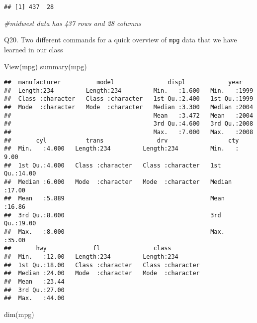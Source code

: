 \documentclass[
]{article}
\newenvironment{Shaded}{\begin{snugshade}}{\end{snugshade}}
\newcommand{\CommentTok}[1]{\textcolor[rgb]{0.56,0.35,0.01}{\textit{#1}}}
\newcommand{\FunctionTok}[1]{\textcolor[rgb]{0.00,0.00,0.00}{#1}}
\newcommand{\NormalTok}[1]{#1}
\begin{document}
\begin{verbatim}
## [1] 437  28
\end{verbatim}

\begin{Shaded}
\begin{Highlighting}[]
\CommentTok{\#midwest data has 437 rows and 28 columns}
\end{Highlighting}
\end{Shaded}

Q20. Two different commands for a quick overview of \texttt{mpg} data
that we have learned in our class

\begin{Shaded}
\begin{Highlighting}[]
\FunctionTok{View}\NormalTok{(mpg)}
\FunctionTok{summary}\NormalTok{(mpg)}
\end{Highlighting}
\end{Shaded}

\begin{verbatim}
##  manufacturer          model               displ            year     
##  Length:234         Length:234         Min.   :1.600   Min.   :1999  
##  Class :character   Class :character   1st Qu.:2.400   1st Qu.:1999  
##  Mode  :character   Mode  :character   Median :3.300   Median :2004  
##                                        Mean   :3.472   Mean   :2004  
##                                        3rd Qu.:4.600   3rd Qu.:2008  
##                                        Max.   :7.000   Max.   :2008  
##       cyl           trans               drv                 cty       
##  Min.   :4.000   Length:234         Length:234         Min.   : 9.00  
##  1st Qu.:4.000   Class :character   Class :character   1st Qu.:14.00  
##  Median :6.000   Mode  :character   Mode  :character   Median :17.00  
##  Mean   :5.889                                         Mean   :16.86  
##  3rd Qu.:8.000                                         3rd Qu.:19.00  
##  Max.   :8.000                                         Max.   :35.00  
##       hwy             fl               class          
##  Min.   :12.00   Length:234         Length:234        
##  1st Qu.:18.00   Class :character   Class :character  
##  Median :24.00   Mode  :character   Mode  :character  
##  Mean   :23.44                                        
##  3rd Qu.:27.00                                        
##  Max.   :44.00
\end{verbatim}

\begin{Shaded}
\begin{Highlighting}[]
\FunctionTok{dim}\NormalTok{(mpg)}
\end{Highlighting}
\end{Shaded}
\end{document}
